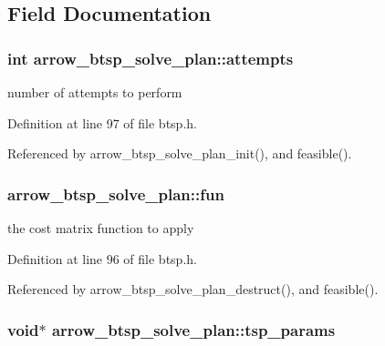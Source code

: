 \subsection{Field Documentation}
\hypertarget{structarrow__btsp__solve__plan_acfa3d4257a33548a9f60ee568219bc5}{
\subsubsection[{attempts}]{\setlength{\rightskip}{0pt plus 5cm}int {\bf arrow\_\-btsp\_\-solve\_\-plan::attempts}}}
\label{structarrow__btsp__solve__plan_acfa3d4257a33548a9f60ee568219bc5}


number of attempts to perform 

Definition at line 97 of file btsp.h.

Referenced by arrow\_\-btsp\_\-solve\_\-plan\_\-init(), and feasible().\hypertarget{structarrow__btsp__solve__plan_89fa2ad1bcc026cd50fd7abc6c30ce3e}{
\subsubsection[{fun}]{ {\bf arrow\_\-btsp\_\-solve\_\-plan::fun}}}
\label{structarrow__btsp__solve__plan_89fa2ad1bcc026cd50fd7abc6c30ce3e}


the cost matrix function to apply 

Definition at line 96 of file btsp.h.

Referenced by arrow\_\-btsp\_\-solve\_\-plan\_\-destruct(), and feasible().\hypertarget{structarrow__btsp__solve__plan_2b7cf65583f45c990218139dbae34ae5}{
\subsubsection[{tsp\_\-params}]{\setlength{\rightskip}{0pt plus 5cm}void$\ast$ {\bf arrow\_\-btsp\_\-solve\_\-plan::tsp\_\-params}}}
\label{structarrow__btsp__solve__plan_2b7cf65583f45c990218139dbae34ae5}


